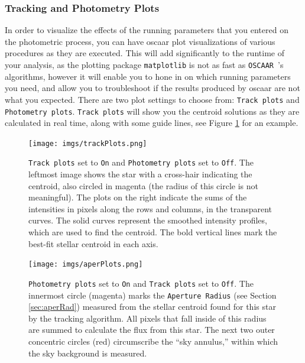 \documentclass[a4paper]{article}
\newcommand{\code}[1]{\texttt{#1}}
\newcommand{\oscaar}{\code{OSCAAR}~}
\begin{document}
\subsubsection{Tracking and Photometry Plots} \label{sec:trackandphotplots}
In order to visualize the effects of the running parameters that you entered on the photometric process, you can have oscaar plot visualizations of various procedures as they are executed. This will add significantly to the runtime of your analysis, as the plotting package \code{matplotlib} is not as fast as \oscaar's algorithms, however it will enable you to hone in on which running parameters you need, and allow you to troubleshoot if the results produced by oscaar are not what you expected. There are two plot settings to choose from: \code{Track plots} and \code{Photometry plots}.  \code{Track plots} will show you the centroid solutions as they are calculated in real time, along with some guide lines, see Figure \ref{fig:trackingExamples} for an example. 

\begin{figure}[H]
\begin{center}
\texttt{[image: imgs/trackPlots.png]}
\caption{\code{Track plots} set to \code{On} and \code{Photometry plots} set to \code{Off}. The leftmost image shows the star with a cross-hair indicating the centroid, also circled in magenta (the radius of this circle is not meaningful). The plots on the right indicate the sums of the intensities in pixels along the rows and columns, in the transparent curves. The solid curves represent the smoothed intensity profiles, which are used to find the centroid. The bold vertical lines mark the best-fit stellar centroid in each axis.}
\label{fig:trackingExamples}
\end{center}	
\end{figure}

\begin{figure}[H]
\begin{center}
\texttt{[image: imgs/aperPlots.png]}
\caption{\code{Photometry plots} set to \code{On} and \code{Track plots} set to \code{Off}. The innermost circle (magenta) marks the \code{Aperture Radius} (see Section \ref{sec:aperRad}) measured from the stellar centroid found for this star by the tracking algorithm. All pixels that fall inside of this radius are summed to calculate the flux from this star. The next two outer concentric circles (red) circumscribe the ``sky annulus,'' within which the sky background is measured. }
\label{fig:photPlots}
\end{center}	
\end{figure}
\end{document}
